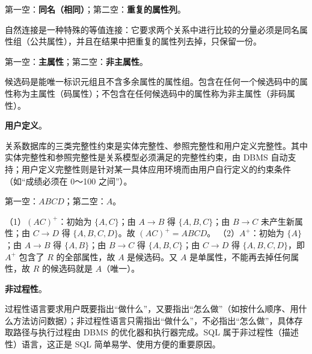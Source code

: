 \documentclass[a4paper,11pt]{article}
\begin{document}
\q 第一空：\textbf{同名（相同）}；第二空：\textbf{重复的属性列}。
\begin{analysis}
自然连接是一种特殊的等值连接：它要求两个关系中进行比较的分量必须是同名属性组（公共属性），并且在结果中把重复的属性列去掉，只保留一份。
\end{analysis}

\q 第一空：\textbf{主属性}；第二空：\textbf{非主属性}。
\begin{analysis}
候选码是能唯一标识元组且不含多余属性的属性组。包含在任何一个候选码中的属性称为主属性（码属性）；不包含在任何候选码中的属性称为非主属性（非码属性）。
\end{analysis}

\q \textbf{用户定义}。
\begin{analysis}
关系数据库的三类完整性约束是实体完整性、参照完整性和用户定义完整性。其中实体完整性和参照完整性是关系模型必须满足的完整性约束，由 DBMS 自动支持；用户定义完整性则是针对某一具体应用环境而由用户自行定义的约束条件（如“成绩必须在 0～100 之间”）。
\end{analysis}

\q 第一空：\textbf{$ABCD$}；第二空：\textbf{$A$}。
\begin{analysis}
（1）$(AC)^{+}$：初始为 $\{A,C\}$；由 $A\to B$ 得 $\{A,B,C\}$；由 $B\to C$ 未产生新属性；由 $C\to D$ 得 $\{A,B,C,D\}$。故 $(AC)^{+}=ABCD$。
（2）$A^{+}$：初始为 $\{A\}$；由 $A\to B$ 得 $\{A,B\}$；由 $B\to C$ 得 $\{A,B,C\}$；由 $C\to D$ 得 $\{A,B,C,D\}$，即 $A^{+}$ 包含了 $R$ 的全部属性，故 $A$ 是候选码。又 $A$ 是单属性，不能再去掉任何属性，故 $R$ 的候选码就是 $A$（唯一）。
\end{analysis}

\q \textbf{非过程性}。
\begin{analysis}
过程性语言要求用户既要指出“做什么”，又要指出“怎么做”（如按什么顺序、用什么方法访问数据）；非过程性语言只需指出“做什么”，不必指出“怎么做”，具体存取路径与执行过程由 DBMS 的优化器和执行器完成。SQL 属于非过程性（描述性）语言，这正是 SQL 简单易学、使用方便的重要原因。
\end{analysis}

\end{document}

